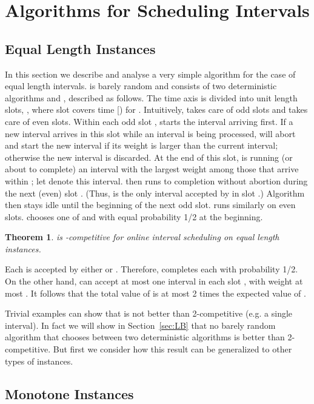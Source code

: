 \documentclass[11pt]{article}
\newtheorem{theorem}{Theorem}[section]
\newcommand{\qed}{\hspace*{\fill}\par\medskip}
\newenvironment{proof}{\noindent{\it Proof. }\ignorespaces}{\qed}
\begin{document}
\section{Algorithms for Scheduling Intervals}

\subsection{Equal Length Instances}

In this section we describe and analyse a very simple algorithm 
 for the case of equal length intervals.
 is barely random and consists of two 
deterministic algorithms  and , described as follows.  
The time axis is divided into unit length slots, ,
where slot  covers time [) for .  
Intuitively,  takes care of odd slots and  takes care of even slots.
Within each odd slot ,  starts the interval arriving first.
If a new interval arrives in this slot while an interval 
is being processed,  will abort and start the new interval 
if its weight is larger than the current interval;
otherwise the new interval is discarded.  
At the end of this slot,
 is running (or about to complete) an interval with the largest weight 
among those that arrive within ; let  denote this interval.
 then runs  to completion without abortion during the 
next (even) slot .  
(Thus,  is the only interval accepted by  in slot .)
Algorithm  then stays idle until the beginning of the next odd slot.
 runs similarly on even slots.
 chooses one of  and  with equal probability 1/2 at the beginning.

\begin{theorem}
 is -competitive for online interval scheduling on equal length 
instances.
\end{theorem}
\begin{proof}
Each  is accepted by either  or .  
Therefore,  completes each  with probability 1/2. 
On the other hand,  can accept
at most one interval in each slot ,
with weight at most .
It follows that the total value of  is at most 2 times the
expected value of .
\end{proof}

Trivial examples can show that  is not better than 2-competitive
(e.g. a single interval).  In fact we will show in Section~\ref{sec:LB} 
that no barely random 
algorithm that chooses between two deterministic algorithms is better
than 2-competitive.
But first we consider how this result can be generalized to other
types of instances.

\subsection{Monotone Instances}
\end{document}
